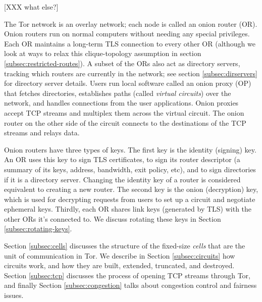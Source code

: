\documentclass[times,10pt,twocolumn]{article}
\begin{document}
%
%


[XXX what else?]



\label{sec:design}

The Tor network is an overlay network; each node is called an onion router
(OR). Onion routers run on normal computers without needing any special
privileges. Each OR maintains a long-term TLS connection to every other
OR (although we look at ways to relax this clique-topology assumption in
section \ref{subsec:restricted-routes}). A subset of the ORs also act as
directory servers, tracking which routers are currently in the network;
see section \ref{subsec:dirservers} for directory server details. Users
run local software called an onion proxy (OP) that fetches directories,
establishes paths (called \emph{virtual circuits}) over the network,
and handles connections from the user applications. Onion proxies accept
TCP streams and multiplex them across the virtual circuit. The onion
router on the other side 
of the circuit connects to the destinations of
the TCP streams and relays data.

Onion routers have three types of keys. The first key is the identity
(signing) key. An OR uses this key to sign TLS certificates, to sign its
router descriptor (a summary of its keys, address, bandwidth, exit policy,
etc), and to sign directories if it is a directory server. Changing the
identity key of a router is considered equivalent to creating a new
router. The second key is the onion (decryption) key, which is used
for decrypting requests from users to set up a circuit and negotiate
ephemeral keys. Thirdly, each OR shares link keys (generated by TLS)
with the other ORs it's connected to. We discuss rotating these keys in
Section \ref{subsec:rotating-keys}.

Section \ref{subsec:cells} discusses the structure of the fixed-size
\emph{cells} that are the unit of communication in Tor. We describe
in Section \ref{subsec:circuits} how circuits work, and how they are
built, extended, truncated, and destroyed. Section \ref{subsec:tcp}
discusses the process of opening TCP streams through Tor, and finally
Section \ref{subsec:congestion} talks about congestion control and
fairness issues.
\end{document}
